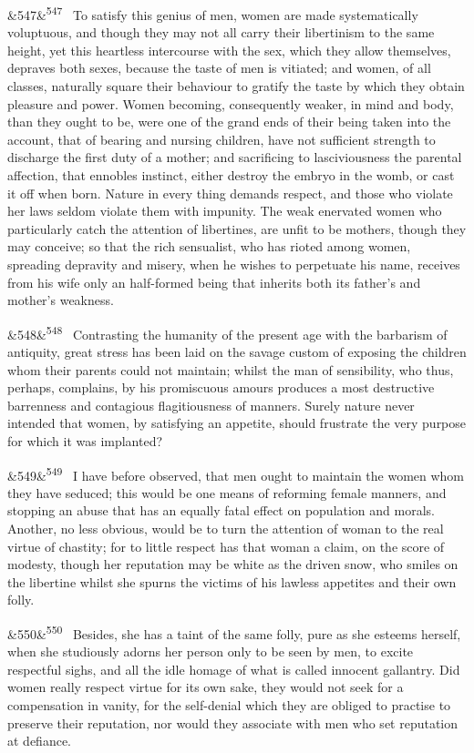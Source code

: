 \documentclass[12pt]{article}
\newcommand{\para}[1][]{\par\noindent\ifx&#1&\else\textsuperscript{\footnotesize #1}~\fi}
\begin{document}
\para[547] To satisfy this genius of men, women are made systematically voluptuous, and though they may not all carry their libertinism to the same height, yet this heartless intercourse with the sex, which they allow themselves, depraves both sexes, because the taste of men is vitiated; and women, of all classes, naturally square their behaviour to gratify the taste by which they obtain pleasure and power. Women becoming, consequently weaker, in mind and body, than they ought to be, were one of the grand ends of their being taken into the account, that of bearing and nursing children, have not sufficient strength to discharge the first duty of a mother; and sacrificing to lasciviousness the parental affection, that ennobles instinct, either destroy the embryo in the womb, or cast it off when born. Nature in every thing demands respect, and those who violate her laws seldom violate them with impunity. The weak enervated women who particularly catch the attention of libertines, are unfit to be mothers, though they may conceive; so that the rich sensualist, who has rioted among women, spreading depravity and misery, when he wishes to perpetuate his name, receives from his wife only an half-formed being that inherits both its father's and mother's weakness.

\para[548] Contrasting the humanity of the present age with the barbarism of antiquity, great stress has been laid on the savage custom of exposing the children whom their parents could not maintain; whilst the man of sensibility, who thus, perhaps, complains, by his promiscuous amours produces a most destructive barrenness and contagious flagitiousness of manners. Surely nature never intended that women, by satisfying an appetite, should frustrate the very purpose for which it was implanted?

\para[549] I have before observed, that men ought to maintain the women whom they have seduced; this would be one means of reforming female manners, and stopping an abuse that has an equally fatal effect on population and morals. Another, no less obvious, would be to turn the attention of woman to the real virtue of chastity; for to little respect has that woman a claim, on the score of modesty, though her reputation may be white as the driven snow, who smiles on the libertine whilst she spurns the victims of his lawless appetites and their own folly.

\para[550] Besides, she has a taint of the same folly, pure as she esteems herself, when she studiously adorns her person only to be seen by men, to excite respectful sighs, and all the idle homage of what is called innocent gallantry. Did women really respect virtue for its own sake, they would not seek for a compensation in vanity, for the self-denial which they are obliged to practise to preserve their reputation, nor would they associate with men who set reputation at defiance.
\end{document}
